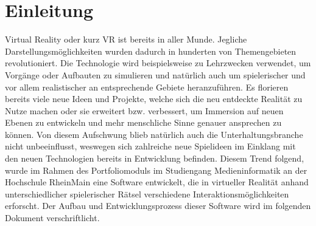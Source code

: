 \chapter{Einleitung}
Virtual Reality oder kurz \dq VR \dq ist bereits in aller Munde. Jegliche Darstellungsmöglichkeiten wurden dadurch in hunderten von Themengebieten revolutioniert. Die Technologie wird beispiels\-weise zu Lehrzwecken verwendet, um Vorgänge oder Aufbauten zu simulieren und natürlich auch um spielerischer und vor allem realistischer an entsprechende Gebiete heranzuführen. Es florieren bereits viele neue Ideen und Projekte, welche sich die neu entdeckte Realität zu Nutze machen oder sie erweitert bzw. verbessert, um Immersion auf neuen  Ebenen zu entwickeln und mehr menschliche Sinne genauer ansprechen zu können. Von diesem Aufschwung blieb natürlich auch die Unterhaltungsbranche nicht unbeeinflusst, weswegen sich zahlreiche neue Spielideen im Einklang mit den neuen Technologien bereits in Entwicklung befinden. Diesem Trend folgend, wurde im Rahmen des Portfoliomoduls im Studiengang Medieninformatik an der Hochschule RheinMain eine Software entwickelt, die in virtueller Realität anhand unterschiedlicher spieler\-ischer Rätsel verschiedene Interaktionsmöglichkeiten erforscht. Der Aufbau und Entwick\-lungsprozess dieser Software wird im folgenden Dokument verschriftlicht.